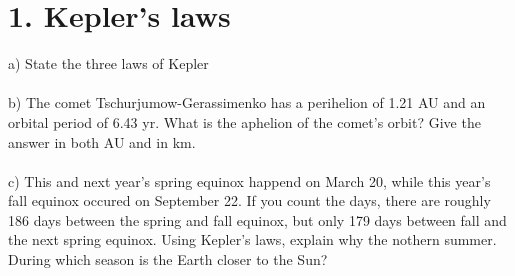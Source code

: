 \section*{1. Kepler's laws}

a) State the three laws of Kepler\\
\\
b) The comet Tschurjumow-Gerassimenko has a perihelion of 1.21 AU and an orbital period of 6.43 yr. What 
is the aphelion of the comet's orbit? Give the answer in both AU and in km.\\
\\
c) This and next year's spring equinox happend on March 20, while this year's fall equinox occured on
September 22. If you count the days, there are roughly 186 days between the spring and fall equinox, but
only 179 days between fall and the next spring equinox. Using Kepler's laws, explain why the nothern
summer. During which season is the Earth closer to the Sun?\\
\\
